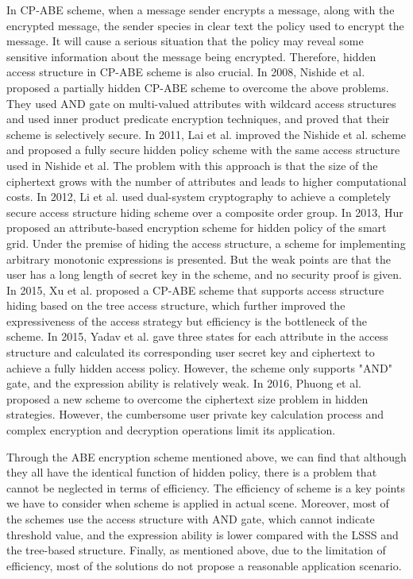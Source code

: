 \documentclass[smallextended]{svjour3}       %
\begin{document}
	In CP-ABE scheme, when a message sender encrypts a message, along with the encrypted message, the sender species in clear text the policy used to encrypt the message. 
	It will cause a serious situation that the policy may reveal some sensitive information about the message being encrypted. 
	Therefore, hidden access structure in CP-ABE scheme is also crucial. 
	In 2008, Nishide et al. proposed a partially hidden CP-ABE scheme to overcome the above problems. 
	They used AND gate on multi-valued attributes with wildcard access structures and used inner product predicate encryption techniques, and proved that their scheme is selectively secure. 
	In 2011, Lai et al. improved the Nishide et al. scheme and proposed a fully secure hidden policy scheme with the same access structure used in Nishide et al. 
	The problem with this approach is that the size of the ciphertext grows with the number of attributes and leads to higher computational costs. 
	In 2012, Li et al. used dual-system cryptography to achieve a completely secure access structure hiding scheme over a composite order group. 
	In 2013, Hur proposed an attribute-based encryption scheme for hidden policy of the smart grid. 
	Under the premise of hiding the access structure, a scheme for implementing arbitrary monotonic expressions is presented. 
	But the weak points are that the user has a long length of secret key in the scheme, and no security proof is given. 
	In 2015, Xu et al. proposed a CP-ABE scheme that supports access structure hiding based on the tree access structure, which further improved the expressiveness of the access strategy but efficiency is the bottleneck of the scheme. 
	In 2015, Yadav et al. gave three states for each attribute in the access structure and calculated its corresponding user secret key and ciphertext to achieve a fully hidden access policy. 
	However, the scheme only supports "AND" gate, and the expression ability is relatively weak. 
	In 2016, Phuong et al. proposed a new scheme to overcome the ciphertext size problem in hidden strategies. 
	However, the cumbersome user private key calculation process and complex encryption and decryption operations limit its application.

	Through the ABE encryption scheme mentioned above, we can find that although they all have the identical function of hidden policy, there is a problem that cannot be neglected in terms of efficiency. 
	The efficiency of scheme is a key points we have to consider when scheme is applied in actual scene. 
	Moreover, most of the schemes use the access structure with AND gate, which cannot indicate threshold value, and the expression ability is lower compared with the LSSS and the tree-based structure. 
	Finally, as mentioned above, due to the limitation of efficiency, most of the solutions do not propose a reasonable application scenario.
\end{document}

